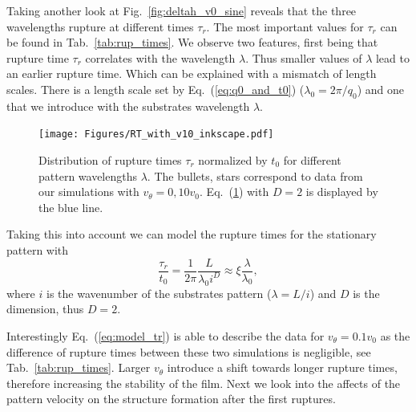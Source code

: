 \documentclass[twocolumn,amsmath,amssymb,showpacs,pre,nofootinbib,superscriptaddress]{revtex4-1} %
\begin{document}
Taking another look at Fig.~\ref{fig:deltah_v0_sine} reveals that the three wavelengths rupture at different times $\tau_r$.
The most important values for $\tau_r$ can be found in Tab.~\ref{tab:rup_times}.
We observe two features, first being that rupture time $\tau_r$ correlates with the wavelength $\lambda$.
Thus smaller values of $\lambda$ lead to an earlier rupture time.
Which can be explained with a mismatch of length scales.
There is a length scale set by Eq.~(\ref{eq:q0_and_t0}) ($\lambda_0 = 2\pi/q_0$) and one that we introduce with the substrates wavelength $\lambda$.
\begin{figure}
    \centering
    \texttt{[image: Figures/RT\_with\_v10\_inkscape.pdf]}
    \caption{Distribution of rupture times $\tau_r$ normalized by $t_0$ for different pattern wavelengths $\lambda$.
    The bullets, stars correspond to data from our simulations with $v_{\theta} = 0, 10v_0$.
    Eq.~(\ref{fig:model_rt}) with $D=2$ is displayed by the blue line.
    }
    \label{fig:model_rt}
\end{figure}
Taking this into account we can model the rupture times for the stationary pattern with
\begin{equation}\label{eq:model_tr}
    \frac{\tau_r}{t_0} = \frac{1}{2\pi}\frac{L}{\lambda_0 i^D}\approx \xi\frac{\lambda}{\lambda_0},    
\end{equation}
where $i$ is the wavenumber of the substrates pattern ($\lambda = L/i$) and $D$ is the dimension, thus $D=2$.

Interestingly Eq.~(\ref{eq:model_tr}) is able to describe the data for $v_{\theta} = 0.1v_0$ as the difference of rupture times between these two simulations is negligible, see Tab.~\ref{tab:rup_times}.
Larger $v_{\theta}$ introduce a shift towards longer rupture times, therefore increasing the stability of the film.
Next we look into the affects of the pattern velocity on the structure formation after the first ruptures.
\end{document}
